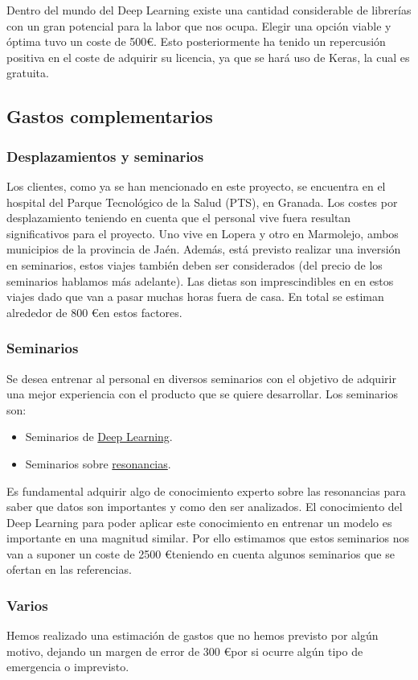 \documentclass[a4paper,12pt,oneside]{article}
\begin{document}
Dentro del mundo del Deep Learning existe una cantidad considerable de librerías con un gran potencial para la labor que nos ocupa. Elegir una opción viable y óptima tuvo un coste de 500\euro. Esto posteriormente ha tenido un repercusión positiva en el coste de adquirir su licencia, ya que se hará uso de Keras, la cual es gratuita.

\subsection{Gastos complementarios}

\subsubsection{Desplazamientos y seminarios}

Los clientes, como ya se han mencionado en este proyecto, se encuentra en el hospital del Parque Tecnológico de la Salud (PTS), en Granada. Los costes por desplazamiento teniendo en cuenta que el personal vive fuera resultan significativos para el proyecto. Uno vive en Lopera y otro en Marmolejo, ambos municipios de la provincia de Jaén. Además, está previsto realizar una inversión en seminarios, estos viajes también deben ser considerados (del precio de los seminarios hablamos más adelante). Las dietas son imprescindibles en en estos viajes dado que van a pasar muchas horas fuera de casa. En total se estiman alrededor de 800 \euro en estos factores.  

\subsubsection{Seminarios}

Se desea entrenar al personal en diversos seminarios con el objetivo de adquirir una mejor experiencia con el producto que se quiere desarrollar. Los seminarios son:

\begin{itemize}
	\item Seminarios de \href{https://kschool.com/cursos/programa-deep-learning/}{Deep Learning}.
	\item Seminarios sobre \href{https://www.emagister.com/cursos-resonancia-magnetica-kwes-11454.htm}{resonancias}.
\end{itemize}

Es fundamental adquirir algo de conocimiento experto sobre las resonancias para saber que datos son importantes y como den ser analizados. El conocimiento del Deep Learning para poder aplicar este conocimiento en entrenar un modelo es importante en una magnitud similar. Por ello estimamos que estos seminarios nos van a suponer un coste de 2500 \euro teniendo en cuenta algunos seminarios que se ofertan en las referencias.

\subsubsection{Varios}

Hemos realizado una estimación de gastos que no hemos previsto por algún motivo, dejando un margen de error de 300 \euro por si ocurre algún tipo de emergencia o imprevisto.
\end{document}
